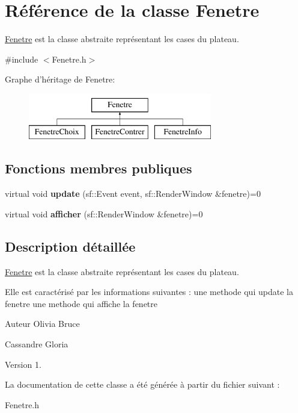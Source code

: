 \hypertarget{classFenetre}{\section{\-Référence de la classe \-Fenetre}
\label{classFenetre}
}


\hyperlink{classFenetre}{\-Fenetre} est la classe abstraite représentant les cases du plateau.  




{\ttfamily \#include $<$\-Fenetre.\-h$>$}

\-Graphe d'héritage de \-Fenetre\-:\begin{figure}[H]
\begin{center}
\leavevmode
\includegraphics[height=2.000000cm]{classFenetre}
\end{center}
\end{figure}
\subsection*{\-Fonctions membres publiques}
\begin{DoxyCompactItemize}
\item 
\hypertarget{classFenetre_a81e85472f9f1994d87bd89bbf3b8bd3c}{virtual void {\bfseries update} (sf\-::\-Event event, sf\-::\-Render\-Window \&fenetre)=0}\label{classFenetre_a81e85472f9f1994d87bd89bbf3b8bd3c}

\item 
\hypertarget{classFenetre_afc2111c7c87beda5a419af6ac81f45c4}{virtual void {\bfseries afficher} (sf\-::\-Render\-Window \&fenetre)=0}\label{classFenetre_afc2111c7c87beda5a419af6ac81f45c4}

\end{DoxyCompactItemize}


\subsection{\-Description détaillée}
\hyperlink{classFenetre}{\-Fenetre} est la classe abstraite représentant les cases du plateau. 

\-Elle est caractérisé par les informations suivantes \-: une methode qui update la fenetre une methode qui affiche la fenetre

\begin{DoxyAuthor}{\-Auteur}
\-Olivia \-Bruce 

\-Cassandre \-Gloria 
\end{DoxyAuthor}
\begin{DoxyVersion}{\-Version}
1. 
\end{DoxyVersion}


\-La documentation de cette classe a été générée à partir du fichier suivant \-:\begin{DoxyCompactItemize}
\item 
\-Fenetre.\-h\end{DoxyCompactItemize}
